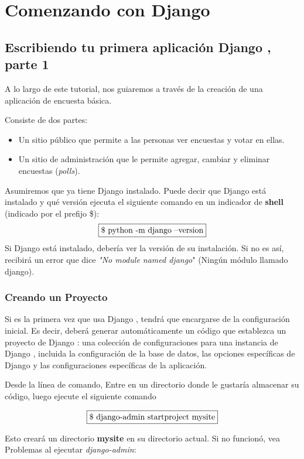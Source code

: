 \documentclass[10pt]{article}
\newcommand{\django}[1]{{\textcolor{G}{Django} #1}}
\begin{document}
\section{Comenzando con \django{}}
\subsection{Escribiendo tu primera aplicación \django{}, parte 1}

A lo largo de este tutorial, nos guiaremos a través de la creación de una aplicación de encuesta básica.

Consiste de dos partes:

\begin{itemize}
	\item 
Un sitio público que permite a las personas ver encuestas y votar en ellas.
	
	\item
Un sitio de administración que le permite agregar, cambiar y eliminar encuestas (\textit{polls}).
\end{itemize}


Asumiremos que ya tiene \django{} instalado. Puede decir que \django{} está instalado y qué versión ejecuta el siguiente comando en un indicador de \textbf{shell} (indicado por el prefijo \$):
$$
\fbox{\$ python -m django --version}
$$
Si \django{} está instalado, debería ver la versión de su instalación. Si no es así, recibirá un error que dice \textit{"No module named django}" (Ningún módulo llamado django).
\subsubsection{Creando un Proyecto}


Si es la primera vez que usa \django{}, tendrá que encargarse de la configuración inicial. Es decir, deberá generar automáticamente un código que establezca un proyecto de \django{}: una colección de configuraciones para una instancia de \django{}, incluida la configuración de la base de datos, las opciones específicas de \django{} y las configuraciones específicas de la aplicación.

Desde la línea de comando, Entre en un directorio donde le gustaría almacenar su código, luego ejecute el siguiente comando

$$
\fbox{\$ django-admin startproject mysite}
$$

Esto creará un directorio \textbf{mysite} en su directorio actual. Si no funcionó, vea Problemas al ejecutar \textit{django-admin}:
\end{document}
